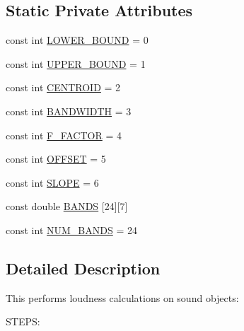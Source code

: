 \subsection*{Static Private Attributes}
\begin{CompactItemize}
\item 
const  int \hyperlink{classLoudness_v0}{LOWER\_\-BOUND} = 0
\item 
const  int \hyperlink{classLoudness_v1}{UPPER\_\-BOUND} = 1
\item 
const  int \hyperlink{classLoudness_v2}{CENTROID} = 2
\item 
const  int \hyperlink{classLoudness_v3}{BANDWIDTH} = 3
\item 
const  int \hyperlink{classLoudness_v4}{F\_\-FACTOR} = 4
\item 
const  int \hyperlink{classLoudness_v5}{OFFSET} = 5
\item 
const  int \hyperlink{classLoudness_v6}{SLOPE} = 6
\item 
const  double \hyperlink{classLoudness_v7}{BANDS} \mbox{[}24\mbox{]}\mbox{[}7\mbox{]}
\item 
const  int \hyperlink{classLoudness_v8}{NUM\_\-BANDS} = 24
\end{CompactItemize}


\subsection{Detailed Description}
This performs loudness calculations on sound objects:

STEPS:

